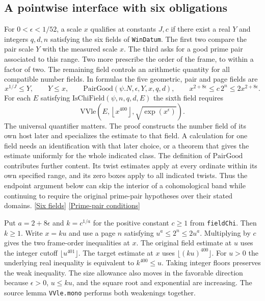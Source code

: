 \documentclass[12pt,letterpaper]{article}
\begin{document}
\subsection{A pointwise interface with six obligations}

For \(0<\epsilon<1/52\), a scale \(x\) qualifies at constants \(J,c\) if there exist a real \(Y\) and integers \(q,d,n\) satisfying the six fields of \texttt{WinDatum}. The first two compare the pair scale \(Y\) with the measured scale \(x\). The third asks for a good prime pair associated to this range. Two more prescribe the order of the frame, to within a factor of two. The remaining field controls an arithmetic quantity for all compatible number fields. In formulas the five geometric, pair and page fields are
\[
 x^{1/J}\le Y,\qquad Y\le x,\qquad
 \mathrm{PairGood}(\psi.N,\epsilon,Y,x,q,d),\qquad
 x^{2+8\epsilon}\le c\,2^n\le2x^{2+8\epsilon}.
\]
For each \(E\) satisfying \(\mathrm{IsChiField}(\psi,n,q,d,E)\) the sixth field requires
\[
 \mathrm{VVle}\!\left(E,\left\lfloor x^{400}\right\rfloor,
       \sqrt{\exp(x^\epsilon)}\right).
\]
The universal quantifier matters. The proof constructs the number field of its own host later and specializes the estimate to that field. A calculation for one field needs an identification with that later choice, or a theorem that gives the estimate uniformly for the whole indicated class. The definition of \(\mathrm{PairGood}\) contributes further content. Its twist estimates apply at every ordinate within its own specified range, and its zero boxes apply to all indicated twists. Thus the endpoint argument below can skip the interior of a cohomological band while continuing to require the original prime-pair hypotheses over their stated domains.
\href{https://github.com/nousentllc/riemann-hypothesis/blob/40e56bab026552e089d7afcfeff08d2defb9c005/src/Development/AutomorphicArithmetic/CharacterBoxes/TwistForm.lean#L19-L26}{[Six fields]}
\href{https://github.com/nousentllc/riemann-hypothesis/blob/40e56bab026552e089d7afcfeff08d2defb9c005/src/Development/AutomorphicArithmetic/CharacterBoxes/PairGood.lean#L20-L34}{[Prime-pair conditions]}

Put \(a=2+8\epsilon\) and \(k=c^{1/a}\) for the positive constant \(c\ge1\) from \texttt{fieldChi}. Then \(k\ge1\). Write \(x=ku\) and use a page \(n\) satisfying \(u^a\le2^n\le 2u^a\). Multiplying by \(c\) gives the two frame-order inequalities at \(x\). The original field estimate at \(u\) uses the integer cutoff \(\lfloor u^{401}\rfloor\). The target estimate at \(x\) uses \(\lfloor(ku)^{400}\rfloor\). For \(u>0\) the underlying real inequality is equivalent to \(k^{400}\le u\). Taking integer floors preserves the weak inequality. The size allowance also moves in the favorable direction because \(\epsilon>0\), \(u\le ku\), and the square root and exponential are increasing. The source lemma \texttt{VVle.mono} performs both weakenings together.
\end{document}
